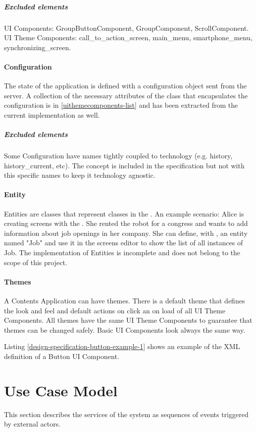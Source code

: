 \subparagraph{Excluded elements} UI Components: GroupButtonComponent, GroupComponent, ScrollComponent. UI Theme Components: call\_to\_action\_screen, main\_menu, smartphone\_menu, synchronizing\_screen.

\paragraph{Configuration} The state of the application is defined with a configuration object sent from the server.
A collection of the necessary attributes of the class that encapsulates the configuration is in \ref{uithemecomponents-list} and has been extracted from the current implementation as well.
\subparagraph{Excluded elements} Some Configuration have names tightly coupled to technology (e.g. history, history\_current, etc). 
The concept is included in the specification but not with this specific names to keep it technology agnostic.

\paragraph{Entity} Entities are classes that represent classes in the \se . 
An example scenario: Alice is creating screens with the \se .
She rented the robot for a congress and wants to add information about job openings in her company.
She can define, with \flangofe , an entity named "Job" and use it in the screens editor to show the list of all instances of Job.
The implementation of Entities is incomplete and does not belong to the scope of this project.

\paragraph{Themes} A Contents Application can have themes.
There is a default theme that defines the look and feel and default actions on click an on load of all UI Theme Components.
All themes have the same UI Theme Components to guarantee that themes can be changed safely.
Basic UI Components look always the same way.

Listing \ref{design-specification-button-example-1} shows an example of the \ac{XML} definition of a Button UI Component.



\FloatBarrier

\section{Use Case Model}
This section describes the services of the system as sequences of events triggered by external actors.

